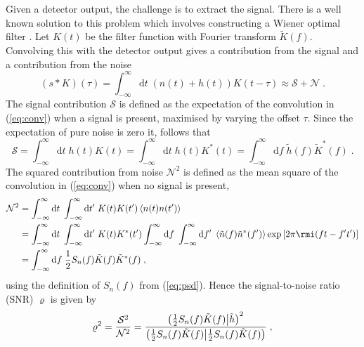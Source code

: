 Given a detector output, the challenge is to extract the signal. There is a well known solution to this problem which involves constructing a Wiener optimal filter \citep{Wiener49}. Let $K(t)$ be the filter function with Fourier transform $\tilde{K}(f)$. Convolving this with the detector output gives a contribution from the signal and a contribution from the noise
\begin{equation}\label{eq:conv}
\left(s*K\right)(\tau) = \int_{-\infty}^{\infty}\mathrm{d}t\;(n(t)+h(t))K(t-\tau) \approx \mathcal{S} + \mathcal{N} \; .
\end{equation}
The signal contribution $\mathcal{S}$ is defined as the expectation of the convolution in (\ref{eq:conv}) when a signal is present, maximised by varying the offset $\tau$.  Since the expectation of pure noise is zero it, follows that
\begin{equation}
\mathcal{S} = \int_{-\infty}^{\infty}\mathrm{d}t\;h(t)K(t)=\int_{-\infty}^{\infty}\mathrm{d}t\;h(t)K^{*}(t)=\int_{-\infty}^{\infty}\mathrm{d}f\; \tilde{h}(f)\tilde{K}^{*}(f) \; .
\end{equation}
The squared contribution from noise $\mathcal{N}^{2}$ is defined as the mean square of the convolution in (\ref{eq:conv}) when no signal is present,
\begin{eqnarray} 
\mathcal{N}^{2} &= \int_{-\infty}^{\infty}\mathrm{d}t\;\int_{-\infty}^{\infty}\mathrm{d}t'\;K(t)K(t')\left<n(t)n(t')\right> \nonumber \\
 &= \int_{-\infty}^{\infty}\mathrm{d}t\;\int_{-\infty}^{\infty}\mathrm{d}t'\;K(t)K^{*}(t')\int_{-\infty}^{\infty}\mathrm{d}f\;\int_{-\infty}^{\infty}\mathrm{d}f'\;\left<\tilde{n}(f)\tilde{n}^{*}(f')\right>\exp\left[2\pi\rmi(ft-f't')\right]\nonumber \\
 &= \int_{-\infty}^{\infty}\mathrm{d}f \; \frac{1}{2}S_{n}(f)\tilde{K}(f)\tilde{K}^{*}(f) \; ,
 \end{eqnarray}
using the definition of $S_{n}(f)$ from (\ref{eq:psd}). Hence the signal-to-noise ratio (SNR) $\varrho$ is given by
\begin{equation}\label{eq:SNRinnerprod} 
\varrho^{2} = \frac{\mathcal{S}^{2}}{\mathcal{N}^{2}}= \frac{\left({\frac{1}{2}S_{n}(f)\tilde{K}(f)}\middle|{\tilde{h}}\right)^{2}}{\left({\frac{1}{2}S_{n}(f)\tilde{K}(f)}\middle|{\frac{1}{2}S_{n}(f)\tilde{K}(f)}\right)} \;,
\end{equation}
